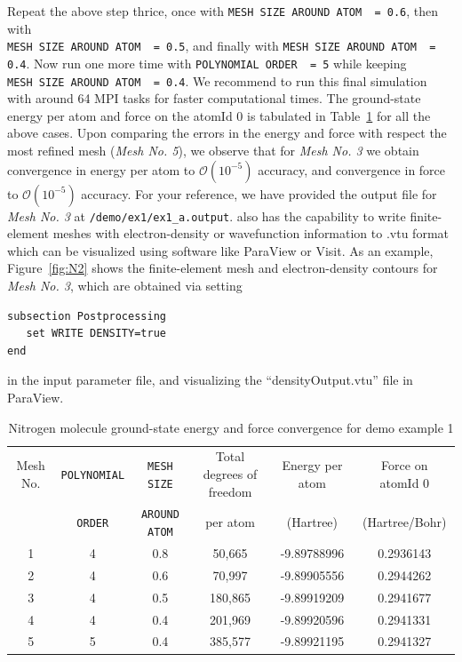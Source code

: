 \begin{enumerate}
Repeat the above step thrice, once with \verb|MESH SIZE AROUND ATOM  = 0.6|, then with\\ \verb|MESH SIZE AROUND ATOM  = 0.5|, and finally with \verb|MESH SIZE AROUND ATOM  = 0.4|. Now run one more time with \verb|POLYNOMIAL ORDER  = 5| while keeping \\ \verb|MESH SIZE AROUND ATOM  = 0.4|. We recommend to run this final simulation with around 64 MPI tasks for faster computational times. The ground-state energy per atom and force on the atomId 0 is tabulated in Table~\ref{tab:table1} for all the above cases. Upon comparing the errors in the energy and force with respect the most refined mesh (\emph{Mesh No. 5}), we observe that for \emph{Mesh No. 3} we obtain convergence in energy per atom to $\mathcal{O}(10^{-5})$ accuracy, and convergence in force to $\mathcal{O}(10^{-5})$ accuracy. For your reference, we have provided the output file for \emph{Mesh No. 3} at \verb|/demo/ex1/ex1_a.output|. \dftfe{} also has the capability to write finite-element meshes with electron-density or wavefunction information to .vtu format which can be visualized using software like ParaView or Visit. As an example, Figure~\ref{fig:N2} shows the finite-element mesh and electron-density contours for \emph{Mesh No. 3}, which are obtained via setting
\begin{verbatim}
subsection Postprocessing
   set WRITE DENSITY=true
end
\end{verbatim}
in the input parameter file, and visualizing the ``densityOutput.vtu'' file in ParaView.
\begin{table}[h!]
  \begin{center}
\small	  
    \caption{Nitrogen molecule ground-state energy and force convergence for demo example 1}
    \label{tab:table1}
    \begin{tabular}{c|c|c|c|c|c}
	    \hline\hline
	    Mesh No. &\verb|POLYNOMIAL| &\verb|MESH SIZE| & Total degrees of freedom& Energy per atom & Force on atomId 0\\
	    &\verb|ORDER| &\verb|AROUND ATOM| & per atom  & (Hartree) & (Hartree/Bohr) \\
      \hline\hline
	    1& 4 & 0.8 & 50,665 & -9.89788996 &  0.2936143\\
	    2&4 & 0.6 &  70,997&  -9.89905556 &  0.2944262\\
	    3&4 & 0.5 & 180,865 & -9.89919209 &  0.2941677\\
	    4&4 & 0.4 & 201,969 & -9.89920596 &  0.2941331\\
	    5&5 & 0.4 & 385,577 & -9.89921195 &  0.2941327\\
	    \hline\hline
    \end{tabular}
  \end{center}
\end{table}


\end{enumerate}
